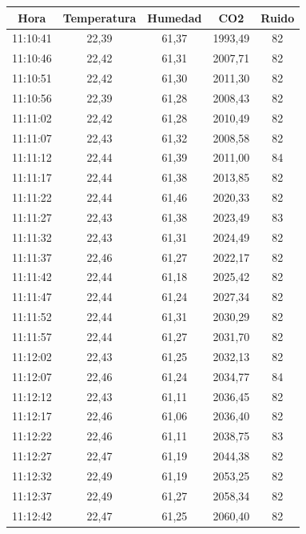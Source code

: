 \documentclass{templateNote}
\begin{document}
\begin{table}[H]
    \centering
    \begin{tabular}{|c|c|c|c|c|}
        \hline
        Hora & Temperatura & Humedad & CO2 & Ruido \\
        \hline
        11:10:41 & 22,39 & 61,37 & 1993,49 & 82 \\\hline
        11:10:46 & 22,42 & 61,31 & 2007,71 & 82 \\\hline
        11:10:51 & 22,42 & 61,30 & 2011,30 & 82 \\\hline
        11:10:56 & 22,39 & 61,28 & 2008,43 & 82 \\\hline
        11:11:02 & 22,42 & 61,28 & 2010,49 & 82 \\\hline
        11:11:07 & 22,43 & 61,32 & 2008,58 & 82 \\\hline
        11:11:12 & 22,44 & 61,39 & 2011,00 & 84 \\\hline
        11:11:17 & 22,44 & 61,38 & 2013,85 & 82 \\\hline
        11:11:22 & 22,44 & 61,46 & 2020,33 & 82 \\\hline
        11:11:27 & 22,43 & 61,38 & 2023,49 & 83 \\\hline
        11:11:32 & 22,43 & 61,31 & 2024,49 & 82 \\\hline
        11:11:37 & 22,46 & 61,27 & 2022,17 & 82 \\\hline
        11:11:42 & 22,44 & 61,18 & 2025,42 & 82 \\\hline
        11:11:47 & 22,44 & 61,24 & 2027,34 & 82 \\\hline
        11:11:52 & 22,44 & 61,31 & 2030,29 & 82 \\\hline
        11:11:57 & 22,44 & 61,27 & 2031,70 & 82 \\\hline
        11:12:02 & 22,43 & 61,25 & 2032,13 & 82 \\\hline
        11:12:07 & 22,46 & 61,24 & 2034,77 & 84 \\\hline
        11:12:12 & 22,43 & 61,11 & 2036,45 & 82 \\\hline
        11:12:17 & 22,46 & 61,06 & 2036,40 & 82 \\\hline
        11:12:22 & 22,46 & 61,11 & 2038,75 & 83 \\\hline
        11:12:27 & 22,47 & 61,19 & 2044,38 & 82 \\\hline
        11:12:32 & 22,49 & 61,19 & 2053,25 & 82 \\\hline
        11:12:37 & 22,49 & 61,27 & 2058,34 & 82 \\\hline
        11:12:42 & 22,47 & 61,25 & 2060,40 & 82 \\\hline

\end{tabular}
\end{table}
\end{document}
